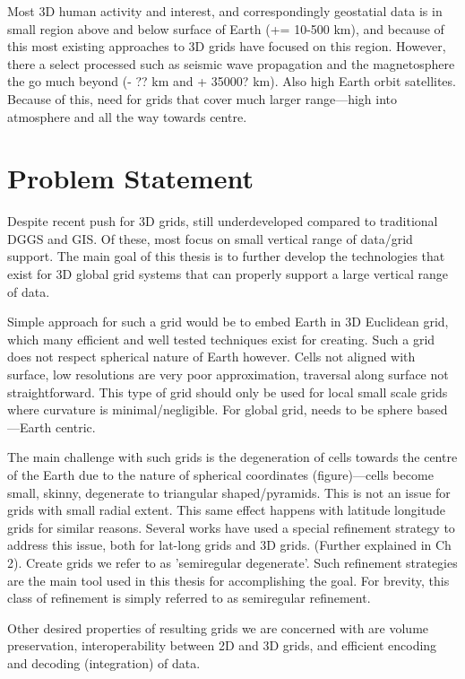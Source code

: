 Most 3D human activity and interest, and correspondingly geostatial data is in small region above and below surface of Earth (+= 10-500 km), and because of this most existing approaches to 3D grids have focused on this region. However, there a select processed such as seismic wave propagation and the magnetosphere the go much beyond (- ?? km and + 35000? km). Also high Earth orbit satellites. Because of this, need for grids that cover much larger range---high into atmosphere and all the way towards centre. 


\section{Problem Statement}

Despite recent push for 3D grids, still underdeveloped compared to traditional DGGS and GIS. Of these, most focus on small vertical range of data/grid support. The main goal of this thesis is to further develop the technologies that exist for 3D global grid systems that can properly support a large vertical range of data.

Simple approach for such a grid would be to embed Earth in 3D Euclidean grid, which many efficient and well tested techniques exist for creating. Such a grid does not respect spherical nature of Earth however. Cells not aligned with surface, low resolutions are very poor approximation, traversal along surface not straightforward. This type of grid should only be used for local small scale grids where curvature is minimal/negligible. For global grid, needs to be sphere based---Earth centric. 

The main challenge with such grids is the degeneration of cells towards the centre of the Earth due to the nature of spherical coordinates (figure)---cells become small, skinny, degenerate to triangular shaped/pyramids. This is not an issue for grids with small radial extent. This same effect happens with latitude longitude grids for similar reasons. Several works have used a special refinement strategy to address this issue, both for lat-long grids and 3D grids. (Further explained in Ch 2). Create grids we refer to as 'semiregular degenerate'. Such refinement strategies are the main tool used in this thesis for accomplishing the goal. For brevity, this class of refinement is simply referred to as semiregular refinement.  

Other desired properties of resulting grids we are concerned with are volume preservation, interoperability between 2D and 3D grids, and efficient encoding and decoding (integration) of data. 

